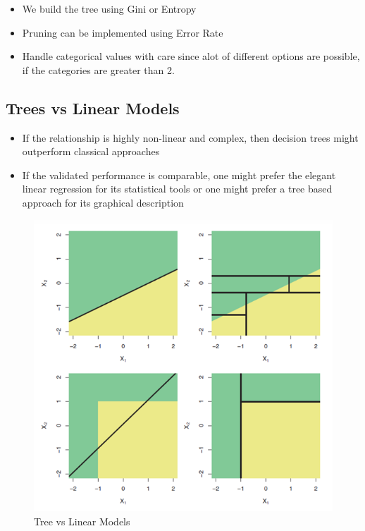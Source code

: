 \documentclass[../Main.tex]{subfiles}
\begin{document}


\begin{itemize}
    \item We build the tree using Gini or Entropy
    \item Pruning can be implemented using Error Rate
    \item Handle categorical values with care since alot of different options are possible,
    if the categories are greater than 2.
\end{itemize}

\subsection{Trees vs Linear Models}
\begin{itemize}
    \item If the relationship is highly non-linear and complex, then decision trees might outperform classical approaches
    \item If the validated performance is comparable, one might prefer the elegant linear regression for its 
    statistical tools or one might prefer a tree based approach for its graphical description
\end{itemize}
\begin{figure}[H]
    \centering
    \includegraphics[width=0.75\linewidth]{Images/tree-vs-linear-models.png}
    \caption{Tree vs Linear Models}
\end{figure}
\end{document}
